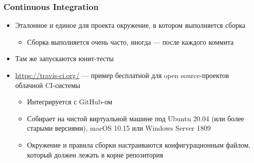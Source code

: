 \documentclass[xetex,mathserif,serif]{beamer}
\begin{document}
    \begin{frame}
        \frametitle{Continuous Integration}
        \begin{itemize}
            \item Эталонное и единое для проекта окружение, в котором выполняется сборка
            \begin{itemize}
                \item Сборка выполняется очень часто, иногда --- после каждого коммита
            \end{itemize}
            \item Там же запускаются юнит-тесты
            \item \url{https://travis-ci.org/} --- пример бесплатной для open source-проектов облачной CI-системы
            \begin{itemize}
                \item Интегрируется с GitHub-ом
                \item Собирает на чистой виртуальной машине под Ubuntu 20.04 (или более старыми версиями), macOS 10.15 или Windows Server 1809
                \item Окружение и правила сборки настраиваются конфигурационным файлом, который должен лежать в корне репозитория
            \end{itemize}
        \end{itemize}
    \end{frame}
\end{document}
